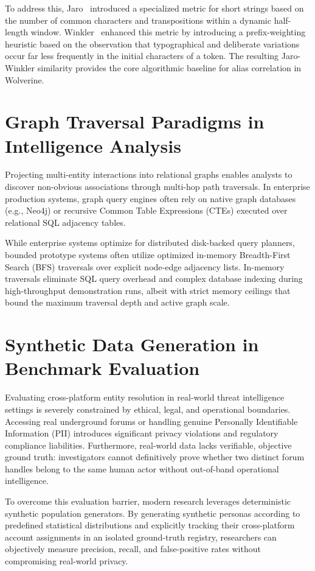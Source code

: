 To address this, Jaro~\cite{jaro1989advances} introduced a specialized metric for short strings based on the number of common characters and transpositions within a dynamic half-length window. Winkler~\cite{winkler1990string} enhanced this metric by introducing a prefix-weighting heuristic based on the observation that typographical and deliberate variations occur far less frequently in the initial characters of a token. The resulting Jaro-Winkler similarity provides the core algorithmic baseline for alias correlation in Wolverine.

\section{Graph Traversal Paradigms in Intelligence Analysis}
\label{sec:related-graph-traversal}
Projecting multi-entity interactions into relational graphs enables analysts to discover non-obvious associations through multi-hop path traversals. In enterprise production systems, graph query engines often rely on native graph databases (e.g., Neo4j) or recursive Common Table Expressions (CTEs) executed over relational SQL adjacency tables.

While enterprise systems optimize for distributed disk-backed query planners, bounded prototype systems often utilize optimized in-memory Breadth-First Search (BFS) traversals over explicit node-edge adjacency lists. In-memory traversals eliminate SQL query overhead and complex database indexing during high-throughput demonstration runs, albeit with strict memory ceilings that bound the maximum traversal depth and active graph scale.

\section{Synthetic Data Generation in Benchmark Evaluation}
\label{sec:related-synthetic-data}
Evaluating cross-platform entity resolution in real-world threat intelligence settings is severely constrained by ethical, legal, and operational boundaries. Accessing real underground forums or handling genuine Personally Identifiable Information (PII) introduces significant privacy violations and regulatory compliance liabilities. Furthermore, real-world data lacks verifiable, objective ground truth: investigators cannot definitively prove whether two distinct forum handles belong to the same human actor without out-of-band operational intelligence.

To overcome this evaluation barrier, modern research leverages deterministic synthetic population generators. By generating synthetic personas according to predefined statistical distributions and explicitly tracking their cross-platform account assignments in an isolated ground-truth registry, researchers can objectively measure precision, recall, and false-positive rates without compromising real-world privacy.

